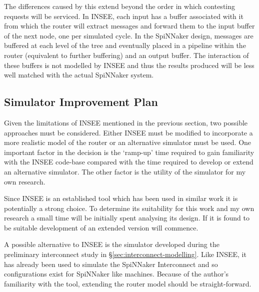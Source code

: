			The differences caused by this extend beyond the order in which contesting
			requests will be serviced. In INSEE, each input has a buffer associated
			with it from which the router will extract messages and forward them to
			the input buffer of the next node, one per simulated cycle. In the
			SpiNNaker design, messages are buffered at each level of the tree and
			eventually placed in a pipeline within the router (equivalent to further
			buffering) and an output buffer. The interaction of these buffers is not
			modelled by INSEE and thus the results produced will be less well matched
			with the actual SpiNNaker system.
			
		
		\subsection{Simulator Improvement Plan}
			
			\label{sec:simulator-improvement-plan}
			
			Given the limitations of INSEE mentioned in the previous section, two
			possible approaches must be considered. Either INSEE must be modified to
			incorporate a more realistic model of the router or an alternative
			simulator must be used.  One important factor in the decision is the
			`ramp-up' time required to gain familiarity with the INSEE code-base
			compared with the time required to develop or extend an alternative
			simulator. The other factor is the utility of the simulator for my own
			research.
			
			Since INSEE is an established tool which has been used in similar work it
			is potentially a strong choice. To determine its suitability for this work
			and my own research a small time will be initially spent analysing its
			design. If it is found to be suitable development of an extended version
			will commence.
			
			A possible alternative to INSEE is the simulator developed during the
			preliminary interconnect study in \S\ref{sec:interconnect-modelling}.
			Like INSEE, it has already been used to simulate the SpiNNaker
			Interconnect and so configurations exist for SpiNNaker like machines.
			Because of the author's familiarity with the tool, extending the router
			model should be straight-forward.
	
